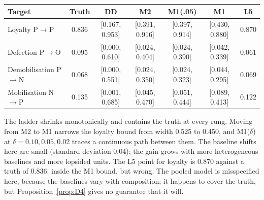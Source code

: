 \begin{center}\small
\setlength{\tabcolsep}{3.5pt}
\begin{tabular}{@{}lcccccc@{}}
\toprule
Target & Truth & DD & M2 & M1(.05) & M1 & L5 \\
\midrule
Loyalty P$\to$P & 0.836 & [0.167, 0.953] & [0.391, 0.916] & [0.397, 0.914] & [0.430, 0.880] & 0.870 \\
Defection P$\to$O & 0.095 & [0.000, 0.610] & [0.024, 0.404] & [0.024, 0.390] & [0.042, 0.339] & 0.061 \\
Demobilisation P$\to$N & 0.068 & [0.000, 0.551] & [0.024, 0.350] & [0.024, 0.323] & [0.044, 0.295] & 0.069 \\
Mobilisation N$\to$P & 0.135 & [0.001, 0.685] & [0.045, 0.470] & [0.051, 0.444] & [0.089, 0.413] & 0.122 \\
\bottomrule
\end{tabular}
\end{center}

The ladder shrinks monotonically and contains the truth at every rung. Moving
from M2 to M1 narrows the loyalty bound from width 0.525 to 0.450, and
M1($\delta$) at $\delta=0.10,0.05,0.02$ traces a continuous path between them. The
baseline shifts here are small (standard deviation 0.04); the gain grows with more
heterogeneous baselines and more lopsided units. The L5 point for loyalty is
0.870 against a truth of 0.836: inside the M1 bound, but wrong. The pooled model
is misspecified here, because the baselines vary with composition; it happens to
cover the truth, but Proposition~\ref{prop:D4} gives no guarantee that it will.
